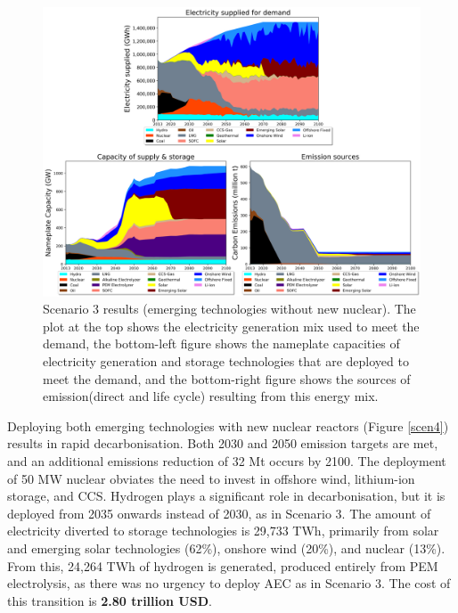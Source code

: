 \begin{figure}[b!] 
\centering
\includegraphics[scale=0.5]{figures/newtechs_nonuc}
\caption{Scenario 3 results (emerging technologies without new nuclear). The plot at the top shows the electricity generation mix used to meet the demand, the bottom-left figure shows the nameplate capacities of electricity generation and storage technologies that are deployed to meet the demand, and the bottom-right figure shows the sources of emission(direct and life cycle) resulting from this energy mix.}
\label{scen3}
\end{figure}

Deploying both emerging technologies with new nuclear reactors (Figure \ref{scen4}) results in rapid decarbonisation. Both 2030 and 2050 emission targets are met, and an additional emissions reduction of 32 Mt occurs by 2100. The deployment of 50 MW nuclear obviates the need to invest in offshore wind, lithium-ion storage, and \gls{CCS}. Hydrogen plays a significant role in decarbonisation, but it is deployed from 2035 onwards instead of 2030, as in Scenario 3. The amount of electricity diverted to storage technologies is 29,733 TWh, primarily from solar and emerging solar technologies (62\%), onshore wind (20\%), and nuclear (13\%). From this, 24,264 TWh of hydrogen is generated, produced entirely from PEM electrolysis, as there was no urgency to deploy \gls{AEC} as in Scenario 3. The cost of this transition is \textbf{2.80 trillion USD}.

